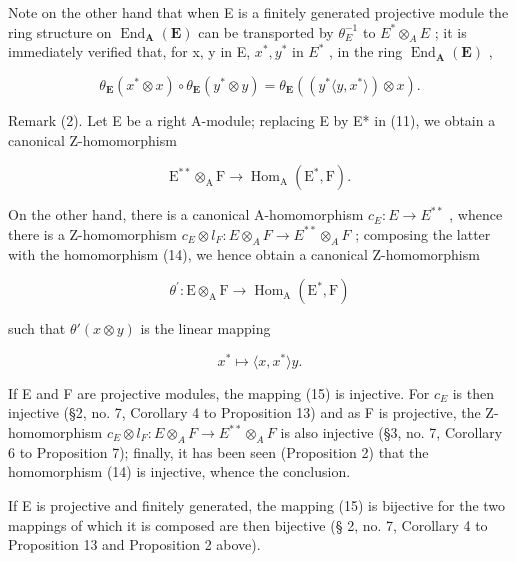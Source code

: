 Note on the other hand that when E is a finitely generated projective module the ring structure on \(\operatorname{End}_{\mathbf{A}}(\mathbf{E})\) can be transported by \(\theta_{E}^{-1}\) to \(E^{*}\otimes_{A}E\) ; it is immediately verified that, for x, y in E, \(x^{*}, y^{*}\) in \(E^{*}\) , in the ring \(\operatorname{End}_{\mathbf{A}}(\mathbf{E})\) ,

\[
\theta_ {\mathbf {E}} (x ^ {*} \otimes x) \circ \theta_ {\mathbf {E}} (y ^ {*} \otimes y) = \theta_ {\mathbf {E}} ((y ^ {*} \langle y, x ^ {*} \rangle) \otimes x).\tag{13}
\]

Remark (2). Let E be a right A-module; replacing E by E* in (11), we obtain a canonical Z-homomorphism

\[
\mathrm{E} ^ {* *} \otimes_ {\mathrm{A}} \mathrm{F} \rightarrow \operatorname{Hom} _ {\mathrm{A}} (\mathrm{E} ^ {*}, \mathrm{F}).\tag{14}
\]

On the other hand, there is a canonical A-homomorphism \(c_{E}:E\to E^{**}\) , whence there is a Z-homomorphism \(c_{E}\otimes l_{F}:E\otimes_{A}F\to E^{**}\otimes_{A}F\) ; composing the latter with the homomorphism (14), we hence obtain a canonical Z-homomorphism

\[
\theta^ {\prime}: \mathrm{E} \otimes_ {\mathrm{A}} \mathrm{F} \rightarrow \operatorname{Hom} _ {\mathrm{A}} (\mathrm{E} ^ {*}, \mathrm{F})\tag{15}
\]

such that \(\theta'(x \otimes y)\) is the linear mapping

\[
x ^ {*} \mapsto \langle x, x ^ {*} \rangle y.
\]

If E and F are projective modules, the mapping (15) is injective. For \(c_{E}\) is then injective (§2, no. 7, Corollary 4 to Proposition 13) and as F is projective, the Z-homomorphism \(c_{E} \otimes l_{F}: E \otimes_{A} F \to E^{**} \otimes_{A} F\) is also injective (§3, no. 7, Corollary 6 to Proposition 7); finally, it has been seen (Proposition 2) that the homomorphism (14) is injective, whence the conclusion.

If E is projective and finitely generated, the mapping (15) is bijective for the two mappings of which it is composed are then bijective (§ 2, no. 7, Corollary 4 to Proposition 13 and Proposition 2 above).

